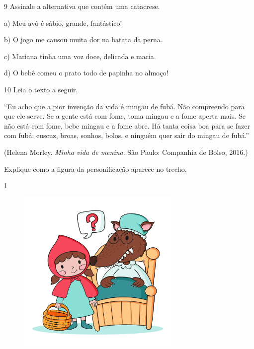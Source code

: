 \num{9} Assinale a alternativa que contém uma catacrese.

a) Meu avô é sábio, grande, fantástico!

b) O jogo me causou muita dor na batata da perna.

c) Mariana tinha uma voz doce, delicada e macia.

d) O bebê comeu o prato todo de papinha no almoço!


\num{10} Leia o texto a seguir.

``Eu acho que a pior invenção da vida é mingau de fubá. Não compreendo
para que ele serve. Se a gente está com fome, toma mingau e a fome
aperta mais. Se não está com fome, bebe mingau e a fome abre. Há tanta
coisa boa para se fazer com fubá: cuscuz, broas, sonhos, bolos, e
ninguém quer sair do mingau de fubá.''

(Helena Morley. \emph{Minha vida de menina}. São Paulo: Companhia de
Bolso, 2016.)

Explique como a figura da personificação aparece no trecho.




\num{1}

\begin{figure}
\includegraphics[width=0.7\textwidth]{./imgSAEB_6_POR/freepik/PORT_6_IMG-30.jpeg}
\end{figure}

